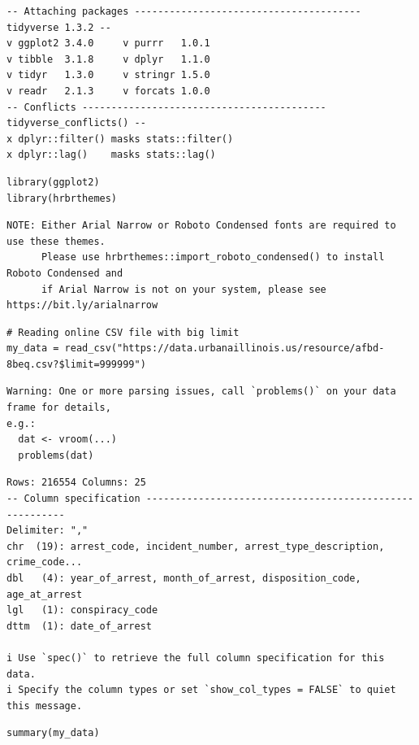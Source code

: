 \documentclass[
  article]{jss}
\begin{document}
\begin{verbatim}
-- Attaching packages --------------------------------------- tidyverse 1.3.2 --
v ggplot2 3.4.0     v purrr   1.0.1
v tibble  3.1.8     v dplyr   1.1.0
v tidyr   1.3.0     v stringr 1.5.0
v readr   2.1.3     v forcats 1.0.0
-- Conflicts ------------------------------------------ tidyverse_conflicts() --
x dplyr::filter() masks stats::filter()
x dplyr::lag()    masks stats::lag()
\end{verbatim}

\begin{verbatim}
library(ggplot2)
library(hrbrthemes)
\end{verbatim}

\begin{verbatim}
NOTE: Either Arial Narrow or Roboto Condensed fonts are required to use these themes.
      Please use hrbrthemes::import_roboto_condensed() to install Roboto Condensed and
      if Arial Narrow is not on your system, please see https://bit.ly/arialnarrow
\end{verbatim}

\begin{verbatim}
# Reading online CSV file with big limit
my_data = read_csv("https://data.urbanaillinois.us/resource/afbd-8beq.csv?$limit=999999")
\end{verbatim}

\begin{verbatim}
Warning: One or more parsing issues, call `problems()` on your data frame for details,
e.g.:
  dat <- vroom(...)
  problems(dat)
\end{verbatim}

\begin{verbatim}
Rows: 216554 Columns: 25
-- Column specification --------------------------------------------------------
Delimiter: ","
chr  (19): arrest_code, incident_number, arrest_type_description, crime_code...
dbl   (4): year_of_arrest, month_of_arrest, disposition_code, age_at_arrest
lgl   (1): conspiracy_code
dttm  (1): date_of_arrest

i Use `spec()` to retrieve the full column specification for this data.
i Specify the column types or set `show_col_types = FALSE` to quiet this message.
\end{verbatim}

\begin{verbatim}
summary(my_data)
\end{verbatim}
\end{document}
